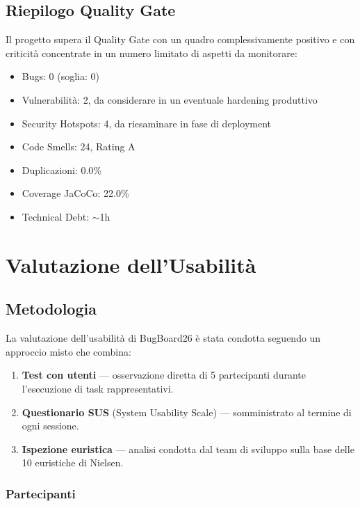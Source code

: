 ﻿\documentclass[a4paper,11pt]{article}
\begin{document}
\subsection{Riepilogo Quality Gate}
Il progetto supera il Quality Gate con un quadro complessivamente positivo e con criticit\`a concentrate in un numero limitato di aspetti da monitorare:
\begin{itemize}
  \item Bugs: 0 (soglia: 0) \checkmark
  \item Vulnerabilit\`a: 2, da considerare in un eventuale hardening produttivo
  \item Security Hotspots: 4, da riesaminare in fase di deployment \checkmark
  \item Code Smells: 24, Rating A \checkmark
  \item Duplicazioni: 0.0\% \checkmark
  \item Coverage JaCoCo: 22.0\%
  \item Technical Debt: $\sim$1h \checkmark
\end{itemize}

\section{Valutazione dell'Usabilit\`a}

\subsection{Metodologia}

La valutazione dell'usabilit\`a di BugBoard26 \`e stata condotta seguendo un approccio misto che combina:
\begin{enumerate}
  \item \textbf{Test con utenti} --- osservazione diretta di 5 partecipanti durante l'esecuzione di task rappresentativi.
  \item \textbf{Questionario SUS} (System Usability Scale) --- somministrato al termine di ogni sessione.
  \item \textbf{Ispezione euristica} --- analisi condotta dal team di sviluppo sulla base delle 10 euristiche di Nielsen.
\end{enumerate}

\subsubsection{Partecipanti}
\end{document}
